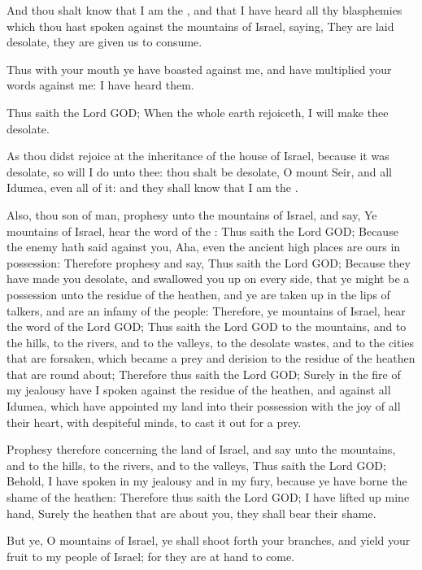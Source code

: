 \Verse And thou shalt know that I am the \LORD, and that I have heard all thy blasphemies which thou hast spoken against the mountains of Israel, saying, They are laid desolate, they are given us to consume.

\Verse Thus with your mouth ye have boasted against me, and have multiplied your words against me: I have heard them.

\Verse Thus saith the Lord GOD; When the whole earth rejoiceth, I will make thee desolate.

\Verse As thou didst rejoice at the inheritance of the house of Israel, because it was desolate, so will I do unto thee: thou shalt be desolate, O mount Seir, and all Idumea, even all of it: and they shall know that I am the \LORD.


\Chapter
\Verse Also, thou son of man, prophesy unto the mountains of Israel, and say, Ye mountains of Israel, hear the word of the \LORD: \Verse Thus saith the Lord GOD; Because the enemy hath said against you, Aha, even the ancient high places are ours in possession: \Verse Therefore prophesy and say, Thus saith the Lord GOD; Because they have made you desolate, and swallowed you up on every side, that ye might be a possession unto the residue of the heathen, and ye are taken up in the lips of talkers, and are an infamy of the people: \Verse Therefore, ye mountains of Israel, hear the word of the Lord GOD; Thus saith the Lord GOD to the mountains, and to the hills, to the rivers, and to the valleys, to the desolate wastes, and to the cities that are forsaken, which became a prey and derision to the residue of the heathen that are round about; \Verse Therefore thus saith the Lord GOD; Surely in the fire of my jealousy have I spoken against the residue of the heathen, and against all Idumea, which have appointed my land into their possession with the joy of all their heart, with despiteful minds, to cast it out for a prey.

\Verse Prophesy therefore concerning the land of Israel, and say unto the mountains, and to the hills, to the rivers, and to the valleys, Thus saith the Lord GOD; Behold, I have spoken in my jealousy and in my fury, because ye have borne the shame of the heathen: \Verse Therefore thus saith the Lord GOD; I have lifted up mine hand, Surely the heathen that are about you, they shall bear their shame.

\Verse But ye, O mountains of Israel, ye shall shoot forth your branches, and yield your fruit to my people of Israel; for they are at hand to come.

